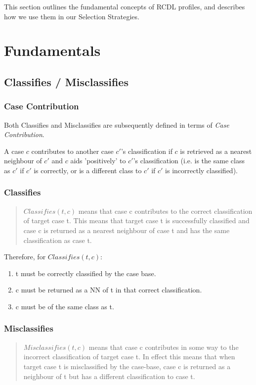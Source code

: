 \documentclass[a4paper,11pt]{report}
\begin{document}
This section outlines the fundamental concepts of RCDL profiles, and describes how we use them in our Selection Strategies.

\section{Fundamentals}
\subsection{Classifies / Misclassifies}
\subsubsection{Case Contribution\label{sec:contributes}}
Both Classifies and Misclassifies are subsequently defined in terms of \emph{Case Contribution}.

A case $c$ contributes to another case $c\prime$'s classification if $c$ is retrieved as a nearest neighbour of $c\prime$ and $c$ aids 'positively' to $c\prime$'s classification (i.e. is the same class as $c\prime$ if $c\prime$ is correctly, or is a different class to  $c\prime$ if  $c\prime$ is incorrectly classified).
\subsubsection{Classifies}
\begin{quote}
$ Classifies(t, c) $ means that case c contributes to the correct classification of target case t. This means that target case t is successfully classified and case c is returned as a nearest neighbour of case t and has the same classification as case t.\cite{Delany2009}
\end{quote}

Therefore, for $ Classifies(t, c) $:
\begin{enumerate}
	\item t must be correctly classified by the case base.
	\item c must be returned as a NN of t in that correct classification.
	\item c must be of the same class as t.
\end{enumerate}

\subsubsection{Misclassifies}

\begin{quote}
$ Misclassifies(t, c ) $ means that case c contributes in some way to the incorrect classification of target case t. In effect this means that when target case t is misclassified by the case-base, case c is returned as a neighbour of t but has a different classification to case t.\cite{Delany2009}
\end{quote}
\end{document}
